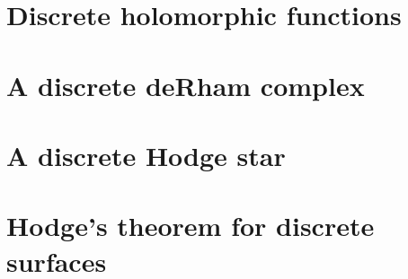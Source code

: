 \documentclass[aps,pra,showpacs,notitlepage,onecolumn,superscriptaddress,nofootinbib]{revtex4-1}
\theoremstyle{definition}
\begin{document}
\section{Discrete holomorphic functions}

\section{A discrete deRham complex}

\section{A discrete Hodge star}

\section{Hodge's theorem for discrete surfaces}
\end{document}
